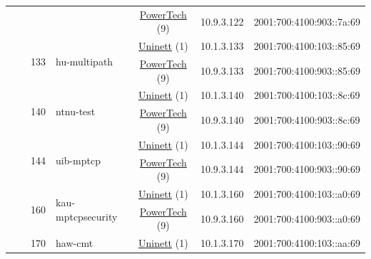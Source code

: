 \begin{small}
\begin{center}
\begin{longtable}{|c|c|c|c|c|c|c|c|}
  &  &  &  & \multicolumn{2}{|c|}{\tiny{\href{http://www.powertech.no}{PowerTech} (9)}} & \tiny{10.9.3.122} & \tiny{2001:700:4100:903::7a:69} \\* \cline{3-3}\cline{4-4}\cline{5-5}\cline{6-6}\cline{7-7}\cline{8-8}
  &  & \multirow{2}{*}{\tiny{133}} & \multicolumn{1}{|l|}{\multirow{2}{*}{\tiny{hu-multipath}}} & \multicolumn{2}{|c|}{\tiny{\href{https://www.uninett.no}{Uninett} (1)}} & \tiny{10.1.3.133} & \tiny{2001:700:4100:103::85:69} \\* \cline{5-5}\cline{6-6}\cline{7-7}\cline{8-8}
  &  &  &  & \multicolumn{2}{|c|}{\tiny{\href{http://www.powertech.no}{PowerTech} (9)}} & \tiny{10.9.3.133} & \tiny{2001:700:4100:903::85:69} \\* \cline{3-3}\cline{4-4}\cline{5-5}\cline{6-6}\cline{7-7}\cline{8-8}
  &  & \multirow{2}{*}{\tiny{140}} & \multicolumn{1}{|l|}{\multirow{2}{*}{\tiny{ntnu-test}}} & \multicolumn{2}{|c|}{\tiny{\href{https://www.uninett.no}{Uninett} (1)}} & \tiny{10.1.3.140} & \tiny{2001:700:4100:103::8c:69} \\* \cline{5-5}\cline{6-6}\cline{7-7}\cline{8-8}
  &  &  &  & \multicolumn{2}{|c|}{\tiny{\href{http://www.powertech.no}{PowerTech} (9)}} & \tiny{10.9.3.140} & \tiny{2001:700:4100:903::8c:69} \\* \cline{3-3}\cline{4-4}\cline{5-5}\cline{6-6}\cline{7-7}\cline{8-8}
  &  & \multirow{2}{*}{\tiny{144}} & \multicolumn{1}{|l|}{\multirow{2}{*}{\tiny{uib-mptcp}}} & \multicolumn{2}{|c|}{\tiny{\href{https://www.uninett.no}{Uninett} (1)}} & \tiny{10.1.3.144} & \tiny{2001:700:4100:103::90:69} \\* \cline{5-5}\cline{6-6}\cline{7-7}\cline{8-8}
  &  &  &  & \multicolumn{2}{|c|}{\tiny{\href{http://www.powertech.no}{PowerTech} (9)}} & \tiny{10.9.3.144} & \tiny{2001:700:4100:903::90:69} \\* \cline{3-3}\cline{4-4}\cline{5-5}\cline{6-6}\cline{7-7}\cline{8-8}
  &  & \multirow{2}{*}{\tiny{160}} & \multicolumn{1}{|l|}{\multirow{2}{*}{\tiny{kau-mptcpsecurity}}} & \multicolumn{2}{|c|}{\tiny{\href{https://www.uninett.no}{Uninett} (1)}} & \tiny{10.1.3.160} & \tiny{2001:700:4100:103::a0:69} \\* \cline{5-5}\cline{6-6}\cline{7-7}\cline{8-8}
  &  &  &  & \multicolumn{2}{|c|}{\tiny{\href{http://www.powertech.no}{PowerTech} (9)}} & \tiny{10.9.3.160} & \tiny{2001:700:4100:903::a0:69} \\* \cline{3-3}\cline{4-4}\cline{5-5}\cline{6-6}\cline{7-7}\cline{8-8}
  &  & \multirow{2}{*}{\tiny{170}} & \multicolumn{1}{|l|}{\multirow{2}{*}{\tiny{haw-cmt}}} & \multicolumn{2}{|c|}{\tiny{\href{https://www.uninett.no}{Uninett} (1)}} & \tiny{10.1.3.170} & \tiny{2001:700:4100:103::aa:69} \\* \cline{5-5}\cline{6-6}\cline{7-7}\cline{8-8}

\end{longtable}
\end{center}
\end{small}
